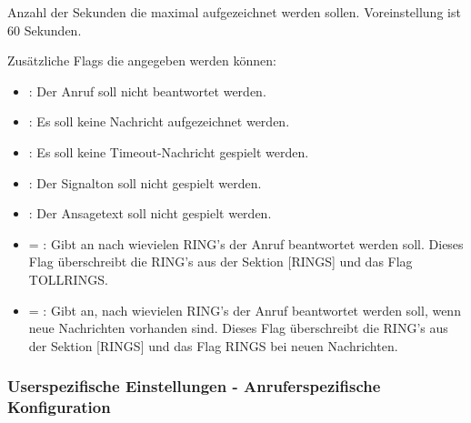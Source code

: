 \begin{description}
    
    Anzahl der Sekunden die maximal aufgezeichnet werden sollen. Voreinstellung ist 60 Sekunden.


    
    Zusätzliche Flags die angegeben werden können:
    \begin{itemize}
        \item {}: Der Anruf soll nicht beantwortet werden.
        \item {}: Es soll keine Nachricht aufgezeichnet werden.
        \item {}: Es soll keine Timeout-Nachricht gespielt werden.
        \item {}: Der Signalton soll nicht gespielt werden.
        \item {}: Der Ansagetext soll nicht gespielt werden.
        \item {}= : Gibt an nach wievielen RING's der Anruf beantwortet werden soll. 
            Dieses Flag überschreibt die RING's aus der Sektion [RINGS] und das Flag TOLLRINGS.
        \item {}= : Gibt an, nach wievielen RING's der Anruf beantwortet werden soll, 
            wenn neue Nachrichten vorhanden sind. Dieses Flag überschreibt die RING's aus der Sektion 
            [RINGS] und das Flag RINGS bei neuen Nachrichten.
    \end{itemize}
\end{description}

\subsubsection{Userspezifische Einstellungen - Anruferspezifische Konfiguration}

